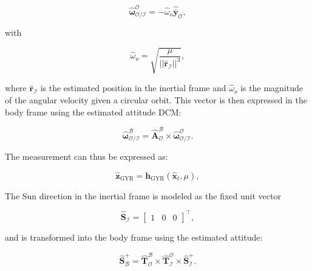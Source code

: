 \begin{equation}
    \boldsymbol{\hat{\omega}}_\mathcal{O/I}^\mathcal{O} = -\hat{\omega}_o \mathbf{\hat{\bar{y}}}_\mathcal{O},
\end{equation}

\noindent
with

\begin{equation}
    \hat{\omega}_o = \sqrt{\frac{\mu}{||\hat{\mathbf{r}}_\mathcal{I}||^3}},
\end{equation}

\noindent where $\hat{\mathbf{r}}_\mathcal{I}$ is the estimated position in the inertial frame and $\hat{\omega}_o$ is the magnitude of the angular velocity given a circular orbit.
This vector is then expressed in the body frame using the estimated attitude DCM:

\begin{equation}
    \boldsymbol{\hat{\omega}}_\mathcal{O/I}^\mathcal{B} 
    = \mathbf{\hat{A}}_\mathcal{O}^\mathcal{B} \times \boldsymbol{\hat{\omega}}_\mathcal{O/I}^\mathcal{O}.
\end{equation}

The measurement can thus be expressed as:

\begin{equation} 
    \mathbf{\hat{z}}_{\text{GYR}} = \mathbf{h}_{\text{GYR}}(\mathbf{\hat{x}}_t,\mu), 
\end{equation}


\label{sec:CSSMeasModel}

\noindent 
The Sun direction in the inertial frame is modeled as the fixed unit vector

\begin{equation}
    \hat{\mathbf{S}}_\mathcal{I} = \begin{bmatrix} 1 & 0 & 0 \end{bmatrix}^\top,
\end{equation}

\noindent
and is transformed into the body frame using the estimated attitude:

\begin{equation}
    \hat{\mathbf{S}}_\mathcal{B}^+ = \mathbf{\hat{T}}_\mathcal{O}^\mathcal{B} \times \mathbf{\hat{T}}_\mathcal{I}^\mathcal{O} \times \hat{\mathbf{S}}_\mathcal{I}^+.
\end{equation}

